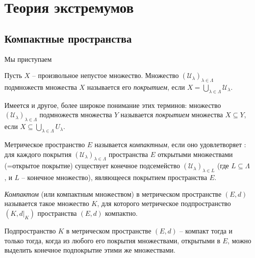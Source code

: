\chapter{Теория экстремумов}

\section{Компактные пространства}

Мы приступаем 

\begin{definition}
 Пусть $X$ -- произвольное непустое множество. Множество $(\mathscr{U}_\lambda)_{\lambda \in \Lambda}$ подмножеств множества $X$ называется его \textit{покрытием}, если $X = \bigcup_{\lambda \in \Lambda} \mathscr{U}_\lambda$.    
\end{definition}

Имеется и другое, более широкое понимание этих терминов: множество $(\mathscr{U}_\lambda)_{\lambda \in \Lambda}$ подмножеств множества $Y$ называется \textit{покрытием} множества $X\subseteq Y$, если $X \subseteq \bigcup_{\lambda \in \Lambda} U_\lambda$.


\begin{definition}
    Метрическое пространство $E$ называется \textit{компактным}, если оно удовлетворяет : для каждого покрытия $(\mathscr{U}_\lambda)_{\lambda \in \Lambda}$ пространства $E$ открытыми множествами (=открытое покрытие) существует конечное подсемейство $(\mathscr{U}_\lambda)_{\lambda \in L}$ (где $L \subseteq \Lambda$, и $L$ -- конечное множество), являющееся покрытием пространства $E.$
\end{definition}

\begin{definition}
\textit{Компактом} (или компактным множеством) в метрическом пространстве $(E,d)$ называется такое множество $K$, для которого метрическое подпространство $(K,d|_K)$ пространства $(E,d)$ компактно.
\end{definition}





\begin{lemma}
    Подпространство $K$ в метрическом пространстве $(E,d)$ -- компакт тогда и только тогда, когда из любого его покрытия множествами, открытыми в $E$, можно выделить конечное подпокрытие этими же множествами.
\end{lemma}

